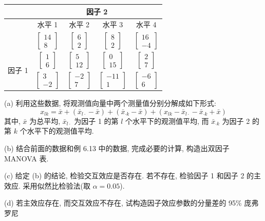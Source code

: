 \begin{mvtable}
\begin{tabular}{c|cccc}
 & \multicolumn{4}{c}{因子 2}\\\midrule
 & 水平 1 & 水平 2 & 水平 3 & 水平 4\\\midrule
 & $\begin{bmatrix}14\\8\end{bmatrix}$ & $\begin{bmatrix}6\\2\end{bmatrix}$ & $\begin{bmatrix}8\\2\end{bmatrix}$ & $\begin{bmatrix}16\\-4\end{bmatrix}$\\[10pt]
\multirow{3}{*}{因子 1} & $\begin{bmatrix}1\\6\end{bmatrix}$ & $\begin{bmatrix}5\\12\end{bmatrix}$ & $\begin{bmatrix}0\\15\end{bmatrix}$ & $\begin{bmatrix}2\\7\end{bmatrix}$\\[10pt]
 & $\begin{bmatrix}3\\-2\end{bmatrix}$ & $\begin{bmatrix}-2\\7\end{bmatrix}$ & $\begin{bmatrix}-11\\1\end{bmatrix}$ & $\begin{bmatrix}-6\\6\end{bmatrix}$
\end{tabular}
\end{mvtable}

\noindent (a) 利用这些数据, 将观测值向量中两个测量值分别分解成如下形式:
\[
x_{lk}=\bar{x}+(\bar{x}_{l\cdot}-\bar{x})+(\bar{x}_{\cdot k}-\bar{x})+(x_{lk}-\bar{x}_{l\cdot}-\bar{x}_{\cdot k}+\bar{x})
\]
其中, $\bar{x}$ 为总平均, $\bar{x}_{l\cdot}$ 为因子 1 的第 $l$ 个水平下的观测值平均, 而 $\bar{x}_{\cdot k}$ 为因子 2 的第 $k$ 个水平下的观测值平均.

\noindent (b) 结合前面的数据和例 6.13 中的数据, 完成必要的计算, 构造出双因子 MANOVA 表.

\noindent (c) 给定 (b) 的结论, 检验交互效应是否存在. 若不存在, 检验因子 1 和因子 2 的主效应. 采用似然比检验法(取 $\alpha=0.05$).

\noindent (d) 若主效应存在, 而交互效应不存在, 试构造因子效应参数的分量差的 95\% 庞弗罗尼
